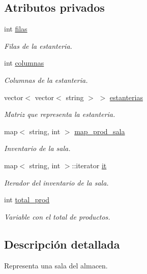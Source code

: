 \subsection*{Atributos privados}
\begin{DoxyCompactItemize}
\item 
int \hyperlink{class_sala_a4cccb03763eea3ebd6d192491b25f7dc}{filas}
\begin{DoxyCompactList}\small\item\em Filas de la estanteria. \end{DoxyCompactList}\item 
int \hyperlink{class_sala_af3c278931f26e28e77fa363e9be82000}{columnas}
\begin{DoxyCompactList}\small\item\em Columnas de la estanteria. \end{DoxyCompactList}\item 
vector$<$ vector$<$ string $>$ $>$ \hyperlink{class_sala_a88aae17b7e590770fe8115b41da2e26a}{estanterias}
\begin{DoxyCompactList}\small\item\em Matriz que representa la estanteria. \end{DoxyCompactList}\item 
map$<$ string, int $>$ \hyperlink{class_sala_a1ee09851cf1735dc48ab69a91952e250}{map\+\_\+prod\+\_\+sala}
\begin{DoxyCompactList}\small\item\em Inventario de la sala. \end{DoxyCompactList}\item 
map$<$ string, int $>$\+::iterator \hyperlink{class_sala_a1cc789ab041a9e3011f9eec9357e8fb0}{it}
\begin{DoxyCompactList}\small\item\em Iterador del inventario de la sala. \end{DoxyCompactList}\item 
int \hyperlink{class_sala_aeb64df257f47ad63fe1ba3b163255e14}{total\+\_\+prod}
\begin{DoxyCompactList}\small\item\em Variable con el total de productos. \end{DoxyCompactList}\end{DoxyCompactItemize}


\subsection{Descripción detallada}
Representa una sala del almacen. 

